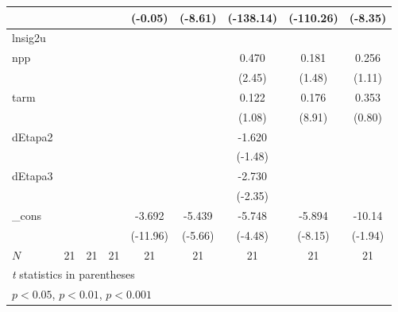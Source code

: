 {\begin{tabular}{l*{8}{c}}
            &                     &                     &                     &     (-0.05)         &     (-8.61)         &   (-138.14)         &   (-110.26)         &     (-8.35)         \\
\hline
lnsig2u     &                     &                     &                     &                     &                     &                     &                     &                     \\
npp         &                     &                     &                     &                     &                     &       0.470\sym{*}  &       0.181         &       0.256         \\
            &                     &                     &                     &                     &                     &      (2.45)         &      (1.48)         &      (1.11)         \\
[1em]
tarm        &                     &                     &                     &                     &                     &       0.122         &       0.176\sym{***}&       0.353         \\
            &                     &                     &                     &                     &                     &      (1.08)         &      (8.91)         &      (0.80)         \\
[1em]
dEtapa2     &                     &                     &                     &                     &                     &      -1.620         &                     &                     \\
            &                     &                     &                     &                     &                     &     (-1.48)         &                     &                     \\
[1em]
dEtapa3     &                     &                     &                     &                     &                     &      -2.730\sym{*}  &                     &                     \\
            &                     &                     &                     &                     &                     &     (-2.35)         &                     &                     \\
[1em]
\_cons      &                     &                     &                     &      -3.692\sym{***}&      -5.439\sym{***}&      -5.748\sym{***}&      -5.894\sym{***}&      -10.14         \\
            &                     &                     &                     &    (-11.96)         &     (-5.66)         &     (-4.48)         &     (-8.15)         &     (-1.94)         \\
\hline
\(N\)       &          21         &          21         &          21         &          21         &          21         &          21         &          21         &          21         \\
\hline\hline
\multicolumn{9}{l}{\footnotesize \textit{t} statistics in parentheses}\\
\multicolumn{9}{l}{\footnotesize \sym{*} \(p<0.05\), \sym{**} \(p<0.01\), \sym{***} \(p<0.001\)}\\
\end{tabular}
}
